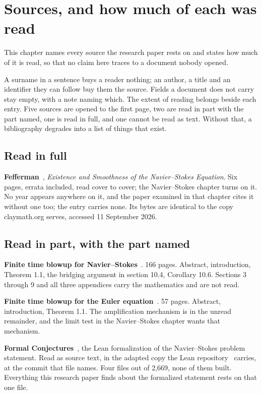 \chapter{Sources, and how much of each was read}

This chapter names every source the research paper rests on and states how much of it is read, so
that no claim here traces to a document nobody opened.

A surname in a sentence buys a reader nothing; an author, a title and an identifier they can follow
buy them the source. Fields a document does not carry stay empty, with a note naming which. The
extent of reading belongs beside each entry. Five sources are opened to the first page, two are read
in part with the part named, one is read in full, and one cannot be read as text. Without that, a
bibliography degrades into a list of things that exist.

\section{Read in full}

\textbf{Fefferman}~\cite{src:Fefferman}, \emph{Existence and Smoothness of the Navier--Stokes
Equation}. Six pages, errata included, read cover to cover; the Navier--Stokes chapter turns on it.
No year appears anywhere on it, and the paper examined in that chapter cites it without one too; the
entry carries none. Its bytes are identical to the copy claymath.org serves, accessed 11
September 2026.

\section{Read in part, with the part named}

\textbf{Finite time blowup for Navier--Stokes}~\cite{src:OpenAI-2026-Navier-Stokes}. 166 pages.
Abstract, introduction, Theorem 1.1, the bridging argument in section 10.4, Corollary 10.6. Sections
3 through 9 and all three appendices carry the mathematics and are not read.

\textbf{Finite time blowup for the Euler equation}~\cite{src:OpenAI-2026-Euler}. 57 pages.
Abstract, introduction, Theorem 1.1. The amplification mechanism is in the unread remainder, and the
limit test in the Navier--Stokes chapter wants that mechanism.

\textbf{Formal Conjectures}~\cite{src:Formal-Conjectures}, the Lean formalization of the
Navier--Stokes problem statement. Read as source text, in the adapted copy the Lean
repository~\cite{src:OpenAI-2026-Lean} carries, at the commit that file names. Four files out of
2{,}669, none of them built. Everything this research paper finds about the formalized statement
rests on that one file.

